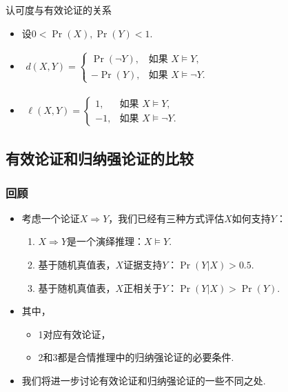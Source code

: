 \begin{frame}{认可度与有效论证的关系}
\begin{itemize}
    \item 设$0< \Pr(X),\Pr(Y) < 1$.
    \item 
    $\begin{aligned}
        d(X, Y) =
        \begin{cases}
            \Pr(\lnot Y),& \text{如果 } X \models Y, \\
            -\Pr(Y),& \text{如果 } X \models \lnot Y.
        \end{cases}
    \end{aligned}$
    \item 
    $\begin{aligned}
        \ell(X, Y) = 
        \begin{cases}
            1,& \text{如果 } X \models Y, \\
            -1,& \text{如果 } X \models \lnot Y.
        \end{cases}
    \end{aligned}$
\end{itemize}
\end{frame}

\subsection{有效论证和归纳强论证的比较}


\begin{frame}
    \frametitle{回顾}
\begin{itemize}
    \item     考虑一个论证$X\Rightarrow Y$，我们已经有三种方式评估$X$如何支持$Y$：
    \begin{enumerate}
        \item $X\Rightarrow Y$是一个演绎推理：$X\models Y$.
        \item 基于随机真值表，$X$证据支持$Y$：$\Pr(Y|X) > 0.5$.
        \item 基于随机真值表，$X$正相关于$Y$：$\Pr(Y|X) > \Pr(Y)$.
    \end{enumerate}
    \item 其中，
    \begin{itemize}
        \item 1对应有效论证，
        \item 2和3都是合情推理中的归纳强论证的必要条件.
    \end{itemize}
    \item 我们将进一步讨论有效论证和归纳强论证的一些不同之处.
\end{itemize}
\end{frame}

